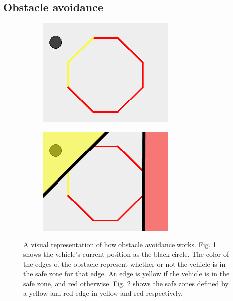 \subsection{Obstacle avoidance}
\begin{figure}[!t]
    \centering
    
    \begin{subfigure}[t]{0.4\columnwidth}
        \includegraphics[width=\textwidth]{img/obs1c}
        \caption{}
        \label{fig:obs-clear}
    \end{subfigure}
    \begin{subfigure}[t]{0.4\columnwidth}
        \includegraphics[width=\textwidth]{img/obs2c}
        \caption{}
        \label{fig:obs-regions}
    \end{subfigure}
    \caption{A visual representation of how obstacle avoidance works. Fig. \ref{fig:obs-clear} shows the vehicle's current position as the black circle. The color of the edges of the obstacle represent whether or not the vehicle is in the safe zone for that edge. An edge is yellow if the vehicle is in the safe zone, and red otherwise. Fig. \ref{fig:obs-regions} shows the safe zones defined by a yellow and red edge in yellow and red respectively. }\label{fig:obs}
\end{figure}
